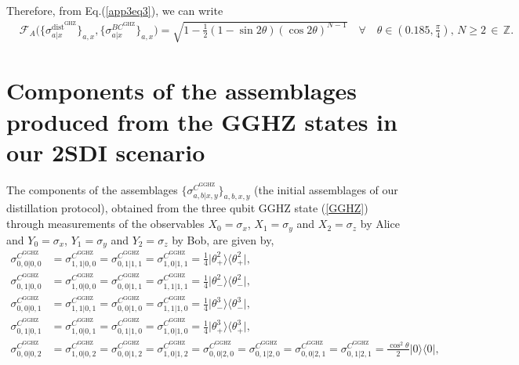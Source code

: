 \documentclass[reprint,superscriptaddress,nofootinbib,amsmath,amssymb,aps,pra,longbibliography]{revtex4-1}
\begin{document}
\begin{widetext}
Therefore, from Eq.(\ref{app3eq3}), we can write
\begin{align}
    &\mathcal{F}_{A} \Big( \{\sigma_{a|x}^{\text{dist}^{\text{GHZ}}} \}_{a,x}, \{\sigma_{a|x}^{BC^{\text{GHZ}}}\}_{a,x} \Big) = \sqrt{1 - \frac{1}{2} (1 - \sin 2 \theta ) (\cos 2 \theta )^{N-1}} \quad \forall \quad \theta \in ( 0.185, \frac{\pi}{4}), \, N \geq 2 \, \in \, \mathbb{Z}.
\end{align}




\section{Components of the assemblages produced from the GGHZ states in our 2SDI scenario}\label{2SAGGHZ}
The components of the assemblages $\{\sigma_{a,b|x,y}^{C^{\text{GGHZ}}}\}_{a,b,x,y}$ (the initial assemblages of our distillation protocol), obtained from the three qubit GGHZ state (\ref{GGHZ}) through measurements of the observables $X_0= \sigma_x$, $X_1=\sigma_y$ and $X_2=\sigma_z$ by Alice and $Y_0= \sigma_x$, $Y_1=\sigma_y$ and $Y_2=\sigma_z$ by Bob, are given by,
\begin{align}
	\sigma_{0,0|0,0}^{C^{\text{GGHZ}}} &= \sigma_{1,1|0,0}^{C^{\text{GGHZ}}} = \sigma_{0,1|1,1}^{C^{\text{GGHZ}}} = \sigma_{1,0|1,1}^{C^{\text{GGHZ}}} = \frac{1}{4} \Big| \theta_+^2 \Big\rangle \Big\langle \theta_+^2 \Big|, \nonumber \\ 
	\sigma_{0,1|0,0}^{C^{\text{GGHZ}}} &= \sigma_{1,0|0,0}^{C^{\text{GGHZ}}} = \sigma_{0,0|1,1}^{C^{\text{GGHZ}}} = \sigma_{1,1|1,1}^{C^{\text{GGHZ}}} = \frac{1}{4} \Big| \theta_-^2 \Big\rangle \Big\langle \theta_-^2 \Big|, \nonumber \\ 
    \sigma_{0,0|0,1}^{C^{\text{GGHZ}}} &= \sigma_{1,1|0,1}^{C^{\text{GGHZ}}} = \sigma_{0,0|1,0}^{C^{\text{GGHZ}}} = \sigma_{1,1|1,0}^{C^{\text{GGHZ}}} = \frac{1}{4} \Big| \theta_-^3 \Big\rangle \Big\langle \theta_-^3 \Big|, \nonumber \\ 
    \sigma_{0,1|0,1}^{C^{\text{GGHZ}}} &= \sigma_{1,0|0,1}^{C^{\text{GGHZ}}} = \sigma_{0,1|1,0}^{C^{\text{GGHZ}}} = \sigma_{1,0|1,0}^{C^{\text{GGHZ}}} = \frac{1}{4} \Big| \theta_+^3 \Big\rangle \Big\langle \theta_+^3 \Big|, \nonumber \\
    \sigma_{0,0|0,2}^{C^{\text{GGHZ}}} &= \sigma_{1,0|0,2}^{C^{\text{GGHZ}}} = \sigma_{0,0|1,2}^{C^{\text{GGHZ}}} = \sigma_{1,0|1,2}^{C^{\text{GGHZ}}} = \sigma_{0,0|2,0}^{C^{\text{GGHZ}}} = \sigma_{0,1|2,0}^{C^{\text{GGHZ}}} = \sigma_{0,0|2,1}^{C^{\text{GGHZ}}} = \sigma_{0,1|2,1}^{C^{\text{GGHZ}}} =  \frac{\cos^2 \theta}{2} | 0 \rangle \langle 0 |, \nonumber \\

\end{align}
\end{widetext}
\end{document}
